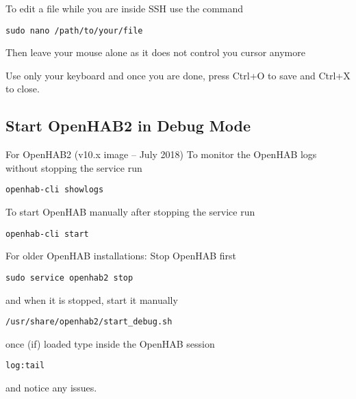 To edit a file while you are inside SSH use the command

\texttt{sudo nano /path/to/your/file}

Then leave your mouse alone as it does not control you cursor anymore

Use only your keyboard and once you are done, press Ctrl+O to save and Ctrl+X to close.

\subsection{Start OpenHAB2 in Debug Mode}

For OpenHAB2 (v10.x image -- July 2018)
To monitor the OpenHAB logs without stopping the service run

\texttt{openhab-cli showlogs}

To start OpenHAB manually after stopping the service run

\texttt{openhab-cli start}

For older OpenHAB installations:
Stop OpenHAB first

\texttt{sudo service openhab2 stop}

and when it is stopped, start it manually

\texttt{/usr/share/openhab2/start\_debug.sh}

once (if) loaded type inside the OpenHAB session

\texttt{log:tail}

and notice any issues.
